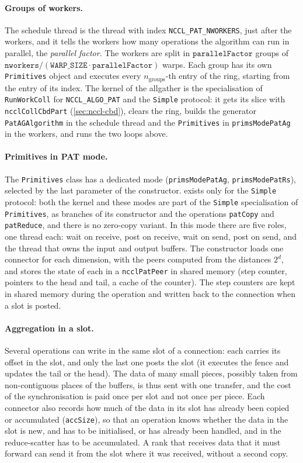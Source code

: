 \paragraph{Groups of workers.}
The schedule thread is the thread with index \texttt{NCCL\_PAT\_NWORKERS}, just after the workers, and it tells the workers how many operations the algorithm can run in parallel, the \emph{parallel factor}.
The workers are split in $\texttt{parallelFactor}$ groups of $\texttt{nworkers}/(\texttt{WARP\_SIZE}\cdot\texttt{parallelFactor})$ warps. Each group has its own \texttt{Primitives} object and executes every $n_{\mathrm{groups}}$-th entry of the ring, starting from the entry of its index.
The kernel of the allgather is the specialisation of \texttt{RunWorkColl} for \texttt{NCCL\_ALGO\_PAT} and the \texttt{Simple} protocol: it gets its slice with \texttt{ncclCollCbdPart} (\cref{sec:nccl-cbd}), clears the ring, builds the generator \texttt{PatAGAlgorithm} in the schedule thread and the \texttt{Primitives} in \texttt{primsModePatAg} in the workers, and runs the two loops above.

\paragraph{Primitives in PAT mode.}
The \texttt{Primitives} class has a dedicated mode (\texttt{primsModePatAg}, \texttt{primsModePatRs}), selected by the last parameter of the constructor.
\pat{} exists only for the \texttt{Simple} protocol: both the kernel and these modes are part of the \texttt{Simple} specialisation of \texttt{Primitives}, as branches of its constructor and the operations \texttt{patCopy} and \texttt{patReduce}, and there is no zero-copy variant.
In this mode there are five roles, one thread each: wait on receive, post on receive, wait on send, post on send, and the thread that owns the input and output buffers.
The constructor loads one connector for each dimension, with the peers computed from the distances $2^d$, and stores the state of each in a \texttt{ncclPatPeer} in shared memory (step counter, pointers to the head and tail, a cache of the counter).
The step counters are kept in shared memory during the operation and written back to the connection when a slot is posted.

\paragraph{Aggregation in a slot.}
Several operations can write in the same slot of a connection: each carries its offset in the slot, and only the last one posts the slot (it executes the fence and updates the tail or the head).
The data of many small pieces, possibly taken from non-contiguous places of the buffers, is thus sent with one transfer, and the cost of the synchronisation is paid once per slot and not once per piece.
Each connector also records how much of the data in its slot has already been copied or accumulated (\texttt{accSize}), so that an operation knows whether the data in the slot is new, and has to be initialised, or has already been handled, and in the reduce-scatter has to be accumulated.
A rank that receives data that it must forward can send it from the slot where it was received, without a second copy.

